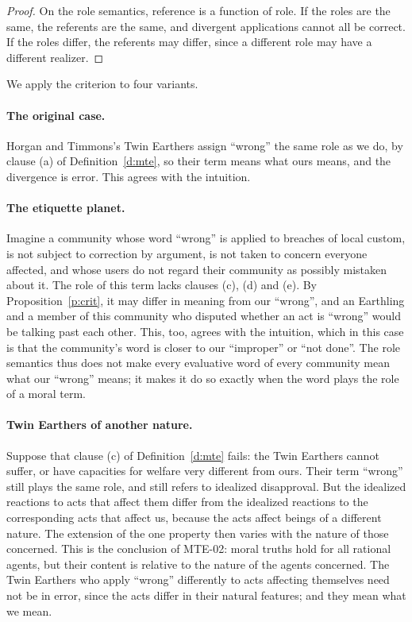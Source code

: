\documentclass{situationist-preprint}
\begin{document}
\begin{proof}
On the role semantics, reference is a function of role. If the roles are the same, the referents are the same, and divergent applications cannot all be correct. If the roles differ, the referents may differ, since a different role may have a different realizer.
\end{proof}

We apply the criterion to four variants.

\paragraph{The original case.} Horgan and Timmons's Twin Earthers assign \enquote{wrong} the same role as we do, by clause (a) of Definition~\ref{d:mte}, so their term means what ours means, and the divergence is error. This agrees with the intuition.

\paragraph{The etiquette planet.} Imagine a community whose word \enquote{wrong} is applied to breaches of local custom, is not subject to correction by argument, is not taken to concern everyone affected, and whose users do not regard their community as possibly mistaken about it. The role of this term lacks clauses (c), (d) and (e). By Proposition~\ref{p:crit}, it may differ in meaning from our \enquote{wrong}, and an Earthling and a member of this community who disputed whether an act is \enquote{wrong} would be talking past each other. This, too, agrees with the intuition, which in this case is that the community's word is closer to our \enquote{improper} or \enquote{not done}. The role semantics thus does not make every evaluative word of every community mean what our \enquote{wrong} means; it makes it do so exactly when the word plays the role of a moral term.

\paragraph{Twin Earthers of another nature.} Suppose that clause (c) of Definition~\ref{d:mte} fails: the Twin Earthers cannot suffer, or have capacities for welfare very different from ours. Their term \enquote{wrong} still plays the same role, and still refers to idealized disapproval. But the idealized reactions to acts that affect them differ from the idealized reactions to the corresponding acts that affect us, because the acts affect beings of a different nature. The extension of the one property then varies with the nature of those concerned. This is the conclusion of MTE-02: moral truths hold for all rational agents, but their content is relative to the nature of the agents concerned. The Twin Earthers who apply \enquote{wrong} differently to acts affecting themselves need not be in error, since the acts differ in their natural features; and they mean what we mean.
\end{document}
